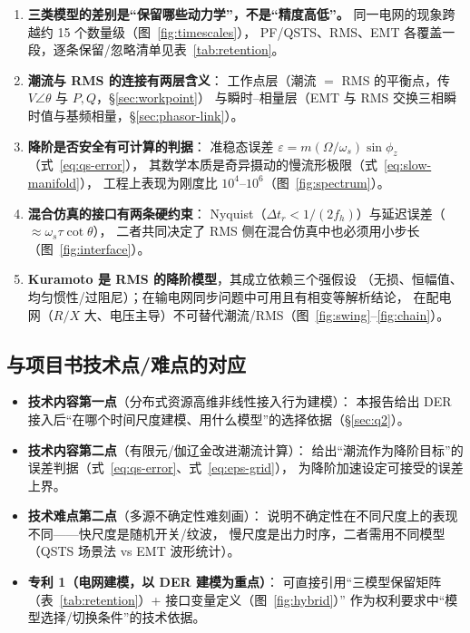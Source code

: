 \begin{enumerate}[leftmargin=1.8em]
\item \textbf{三类模型的差别是“保留哪些动力学”，不是“精度高低”。}
同一电网的现象跨越约 15 个数量级（图~\ref{fig:timescales}），
PF/QSTS、RMS、EMT 各覆盖一段，逐条保留/忽略清单见表~\ref{tab:retention}。
\item \textbf{潮流与 RMS 的连接有两层含义}：
工作点层（潮流 $=$ RMS 的平衡点，传 $V\angle\theta$ 与 $P,Q$，\S\ref{sec:workpoint}）
与瞬时--相量层（EMT 与 RMS 交换三相瞬时值与基频相量，\S\ref{sec:phasor-link}）。
\item \textbf{降阶是否安全有可计算的判据}：
准稳态误差 $\varepsilon=m(\Omega/\omega_s)\sin\phi_z$（式~\eqref{eq:qs-error}），
其数学本质是奇异摄动的慢流形极限（式~\eqref{eq:slow-manifold}），
工程上表现为刚度比 $10^4$--$10^6$（图~\ref{fig:spectrum}）。
\item \textbf{混合仿真的接口有两条硬约束}：
Nyquist（$\Delta t_r<1/(2f_h)$）与延迟误差（$\approx\omega_s\tau\cot\theta$），
二者共同决定了 RMS 侧在混合仿真中也必须用小步长（图~\ref{fig:interface}）。
\item \textbf{Kuramoto 是 RMS 的降阶模型}，其成立依赖三个强假设
（无损、恒幅值、均匀惯性/过阻尼）；在输电网同步问题中可用且有相变等解析结论，
在配电网（$R/X$ 大、电压主导）不可替代潮流/RMS（图~\ref{fig:swing}--\ref{fig:chain}）。
\end{enumerate}

\subsection{与项目书技术点/难点的对应}

\begin{itemize}[leftmargin=1.6em]
\item \textbf{技术内容第一点}（分布式资源高维非线性接入行为建模）：
本报告给出 DER 接入后“在哪个时间尺度建模、用什么模型”的选择依据（\S\ref{sec:q2}）。
\item \textbf{技术内容第二点}（有限元/伽辽金改进潮流计算）：
给出“潮流作为降阶目标”的误差判据（式~\eqref{eq:qs-error}、式~\eqref{eq:eps-grid}），
为降阶加速设定可接受的误差上界。
\item \textbf{技术难点第二点}（多源不确定性难刻画）：
说明不确定性在不同尺度上的表现不同——快尺度是随机开关/纹波，
慢尺度是出力时序，二者需用不同模型（QSTS 场景法 vs EMT 波形统计）。
\item \textbf{专利 1（电网建模，以 DER 建模为重点）}：
可直接引用“三模型保留矩阵（表~\ref{tab:retention}）+ 接口变量定义（图~\ref{fig:hybrid}）”
作为权利要求中“模型选择/切换条件”的技术依据。
\end{itemize}


